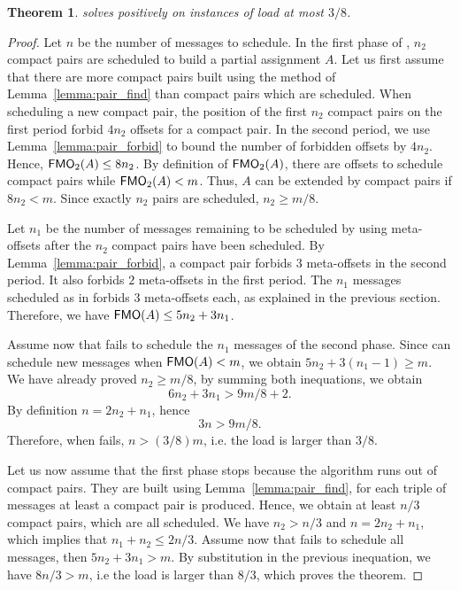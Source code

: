 \documentclass[pdflatex,sn-mathphys,iicol]{sn-jnl}%
\theoremstyle{thmstyleone}%
\newtheorem{theorem}{Theorem}%
\theoremstyle{thmstyletwo}%
\theoremstyle{thmstylethree}%
\begin{document}
\begin{theorem}\label{th:pair}
\compactpair solves \pma positively on instances of load at most $3/8$.
\end{theorem}
\begin{proof}
Let $n$ be the number of messages to schedule.
In the first phase of \compactpair, $n_2$ compact pairs are scheduled to build a partial assignment $A$. Let us first assume that there are more compact pairs built using the method of Lemma~\ref{lemma:pair_find} than compact pairs which are scheduled.
When scheduling a new compact pair, the position of the first $n_2$ compact pairs on the first period forbid $4n_2$ offsets for a compact pair. In the second period, we use Lemma~\ref{lemma:pair_forbid} to bound the number of forbidden offsets by $4n_2$.   
Hence, $\textsf{FMO}_2(A) \leq 8n_2$. By definition of $\textsf{FMO}_2(A)$, there are offsets to schedule compact pairs while $\textsf{FMO}_2(A) < m$. Thus, $A$ can be extended by compact pairs if $8n_2 < m$.
Since exactly $n_2$ pairs are scheduled, $n_2 \geq m/8$.  

Let $n_1$ be the number of messages remaining to be scheduled by \compactpair using meta-offsets after the $n_2$ compact pairs have been scheduled. By Lemma~\ref{lemma:pair_forbid}, a compact pair forbids $3$ meta-offsets in the second period. It also forbids $2$ meta-offsets in the first period. The $n_1$ messages scheduled as in \metaoffset forbids $3$ meta-offsets each, as explained in the previous section.
Therefore, we have $\textsf{FMO}(A) \leq 5n_2 + 3n_1$. 

Assume now that \compactpair fails to schedule the $n_1$ messages of the second phase.
Since \compactpair can schedule new messages when $\textsf{FMO}(A) < m$, 
we obtain $5n_2 + 3(n_1-1) \geq m$. We have already proved $n_2 \geq  m/8$, by summing both inequations, we obtain $$6n_2 + 3n_1 > 9m/8 + 2.$$ By definition $n = 2n_2 + n_1$, hence $$3n > 9m/8.$$ Therefore, when \compactpair fails, $n > (3/8)m$, i.e. the load is larger than $3/8$.

Let us now assume that the first phase stops because the algorithm runs out of compact pairs. They are built using Lemma~\ref{lemma:pair_find}, for each triple of messages at least a compact pair is produced. Hence, we obtain at least $n/3$ compact pairs, which are all scheduled. We have $n_2 > n/3$ and $n= 2n_2 + n_1$, which implies that $n_1 + n_2 \leq 2n/3$.
Assume now that \compactpair fails to schedule all messages, then $5n_2 + 3n_1 > m$.
By substitution in the previous inequation, we have $ 8n/3  > m$, i.e the load is larger than $8/3$, which proves the theorem.
\end{proof}
\end{document}
